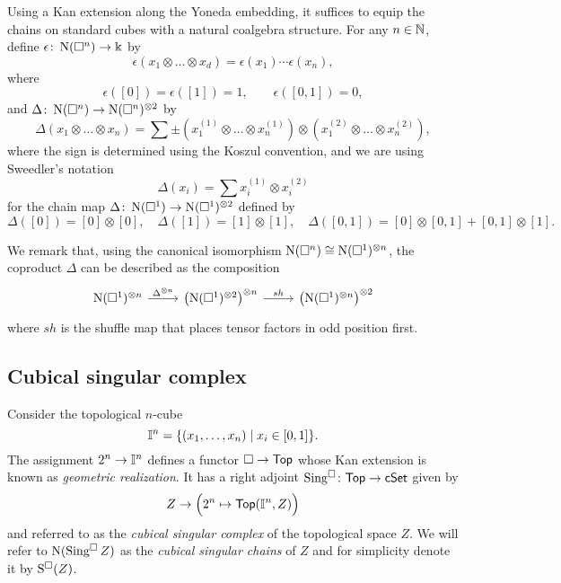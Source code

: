 Using a Kan extension along the Yoneda embedding, it suffices to equip the chains on standard cubes with a natural coalgebra structure.
For any $n \in \mathbb{N}$, define $\epsilon \colon \operatorname{N}(\square^n) \to \Bbbk$ by
\[
\epsilon \left( x_1 \otimes \dots \otimes x_d \right) = \epsilon(x_1) \dotsm \epsilon(x_n),
\]
where
\[
\epsilon([0]) = \epsilon([1]) = 1, \qquad \epsilon([0, 1]) = 0,
\]
and $\Delta \colon \operatorname{N}(\square^n) \to \operatorname{N}(\square^n)^{\otimes 2}$ by
\[
\Delta (x_1 \otimes \dots \otimes x_n) =
\sum \pm \left( x_1^{(1)} \otimes \dots \otimes x_n^{(1)} \right) \otimes
\left( x_1^{(2)} \otimes \dots \otimes x_n^{(2)} \right),
\]
where the sign is determined using the Koszul convention, and we are using Sweedler's notation
\[
\Delta(x_i) = \sum x_i^{(1)} \otimes x_i^{(2)}
\]
for the chain map $\Delta \colon \operatorname{N}(\square^1) \to \operatorname{N}(\square^1)^{\otimes 2}$ defined by
\[
\Delta([0]) = [0] \otimes [0], \quad \Delta([1]) = [1] \otimes [1], \quad \Delta([0,1]) = [0] \otimes [0,1] + [0,1] \otimes [1].
\]

We remark that, using the canonical isomorphism $\operatorname{N}(\square^n) \cong \operatorname{N}(\square^1)^{\otimes n}$, the coproduct $\Delta$ can be described as the composition
\[
\begin{tikzcd}
\chains(\cube^1)^{\otimes n} \arrow[r, "\Delta^{\otimes n}"] & \left( \chains(\cube^1)^{\otimes 2} \right)^{\otimes n} \arrow[r, "sh"] & \left( \chains(\cube^1)^{\otimes n} \right)^{\otimes 2}
\end{tikzcd}
\]
where $sh$ is the shuffle map that places tensor factors in odd position first.

\subsection{Cubical singular complex}

Consider the topological $n$-cube
\[
\mathbb{I}^{n} = \{(x_1, \dots, x_n) \mid x_i \in [0,1]\}.
\]
The assignment $2^n \to \mathbb{I}^n$ defines a functor $\square \to \mathsf{Top}$ whose Kan extension is known as \textit{geometric realization}.
It has a right adjoint $\operatorname{Sing^{\square}} \colon \mathsf{Top} \to \mathsf{cSet}$ given by
\[
Z \to \Big(2^n \mapsto \mathsf{Top}(\mathbb{I}^n, Z)\Big)
\]
and referred to as the \textit{cubical singular complex} of the topological space $Z$.
We will refer to $\operatorname{N}(\operatorname{Sing^{\square}} Z)$ as the \textit{cubical singular chains} of $Z$ and for simplicity denote it by $\operatorname{S^{\square}}(Z)$.